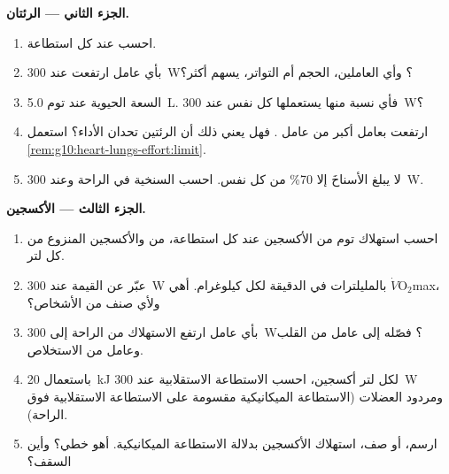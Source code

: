 \begin{problem}
\medskip
\noindent\textbf{الجزء الثاني --- الرئتان.}
\begin{enumerate}[resume]
  \item احسب  عند كل استطاعة.
  \item بأي عامل ارتفعت عند \qty{300}{W}؟ وأي العاملين، الحجم أم
        التواتر، يسهم أكثر؟
  \item السعة الحيوية عند توم \qty{5.0}{L}. فأي نسبة منها يستعملها كل
        نفس عند \qty{300}{W}؟
  \item ارتفعت  بعامل أكبر من عامل . فهل يعني ذلك
        أن الرئتين تحدان الأداء؟ استعمل
        \cref{rem:g10:heart-lungs-effort:limit}.
  \item لا يبلغ الأسناخَ إلا 70\% من كل نفس. احسب  السنخية في
        الراحة وعند \qty{300}{W}.
\end{enumerate}

\medskip
\noindent\textbf{الجزء الثالث --- الأكسجين.}
\begin{enumerate}[resume]
  \item احسب استهلاك توم من الأكسجين عند كل استطاعة، من 
        والأكسجين المنزوع من كل لتر.
  \item عبّر عن القيمة عند \qty{300}{W} بالمليلترات في الدقيقة لكل
        كيلوغرام. أهي $\dot V\!\mathrm{O_2}$max، ولأي صنف من الأشخاص؟
  \item بأي عامل ارتفع الاستهلاك من الراحة إلى \qty{300}{W}؟ فصّله
        إلى عامل من القلب وعامل من الاستخلاص.
  \item باستعمال \qty{20}{kJ} لكل لتر أكسجين، احسب الاستطاعة
        الاستقلابية عند \qty{300}{W} ومردود العضلات (الاستطاعة
        الميكانيكية مقسومة على الاستطاعة الاستقلابية فوق الراحة).
  \item ارسم، أو صف، استهلاك الأكسجين بدلالة الاستطاعة الميكانيكية.
        أهو خطي؟ وأين السقف؟
\end{enumerate}


\end{problem}

